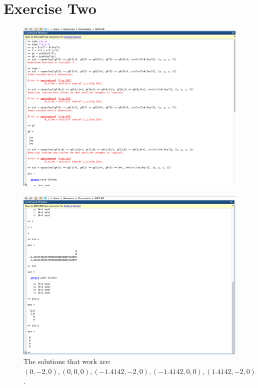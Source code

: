\documentclass[11pt]{article}
\begin{document}
\section*{Exercise Two}
\begin{figure}[H]
	\centering
	\includegraphics[width=\textwidth]{Prob2PartA.png}
\end{figure}
\begin{figure}[H]
	\centering
	\includegraphics[width=\textwidth]{Prob2PartB.png}
	\caption*{The solutions that work are: $(0, -2, 0), (0,0,0), (-1.4142, -2, 0), (-1.4142, 0, 0), (1.4142, -2, 0)$.}
\end{figure}
\end{document}
